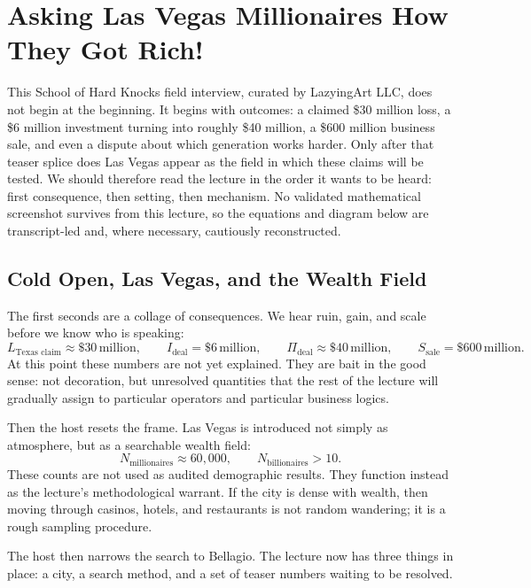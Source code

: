 \chapter{Asking Las Vegas Millionaires How They Got Rich!}

This School of Hard Knocks field interview, curated by LazyingArt LLC, does not begin at the beginning. It begins with outcomes: a claimed \$30 million loss, a \$6 million investment turning into roughly \$40 million, a \$600 million business sale, and even a dispute about which generation works harder. Only after that teaser splice does Las Vegas appear as the field in which these claims will be tested. We should therefore read the lecture in the order it wants to be heard: first consequence, then setting, then mechanism. No validated mathematical screenshot survives from this lecture, so the equations and diagram below are transcript-led and, where necessary, cautiously reconstructed.

\section{Cold Open, Las Vegas, and the Wealth Field}

The first seconds are a collage of consequences. We hear ruin, gain, and scale before we know who is speaking:
\begin{equation}
L_{\text{Texas claim}} \approx \$30\,\text{million},\qquad
I_{\text{deal}} = \$6\,\text{million},\qquad
\Pi_{\text{deal}} \approx \$40\,\text{million},\qquad
S_{\text{sale}} = \$600\,\text{million}.
\end{equation}
At this point these numbers are not yet explained. They are bait in the good sense: not decoration, but unresolved quantities that the rest of the lecture will gradually assign to particular operators and particular business logics.

Then the host resets the frame. Las Vegas is introduced not simply as atmosphere, but as a searchable wealth field:
\begin{equation}
N_{\text{millionaires}} \approx 60{,}000,\qquad
N_{\text{billionaires}} > 10.
\end{equation}
These counts are not used as audited demographic results. They function instead as the lecture's methodological warrant. If the city is dense with wealth, then moving through casinos, hotels, and restaurants is not random wandering; it is a rough sampling procedure.

The host then narrows the search to Bellagio. The lecture now has three things in place: a city, a search method, and a set of teaser numbers waiting to be resolved.

